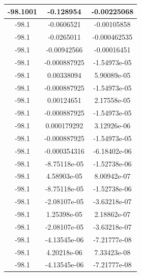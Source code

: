 \documentclass[a4paper,14pt]{extarticle}
\begin{document}
\begin{enumerate}[1. ]
\begin{center}
\begin{longtable}{|c|c|c|}
                  \hline
                  -98.1001 & -0.128954    & -0.00225068  \\
                  \hline
                  -98.1    & -0.0606521   & -0.00105858  \\
                  \hline
                  -98.1    & -0.0265011   & -0.000462535 \\
                  \hline
                  -98.1    & -0.00942566  & -0.00016451  \\
                  \hline
                  -98.1    & -0.000887925 & -1.54973e-05 \\
                  \hline
                  -98.1    & 0.00338094   & 5.90089e-05  \\
                  \hline
                  -98.1    & -0.000887925 & -1.54973e-05 \\
                  \hline
                  -98.1    & 0.00124651   & 2.17558e-05  \\
                  \hline
                  -98.1    & -0.000887925 & -1.54973e-05 \\
                  \hline
                  -98.1    & 0.000179292  & 3.12926e-06  \\
                  \hline
                  -98.1    & -0.000887925 & -1.54973e-05 \\
                  \hline
                  -98.1    & -0.000354316 & -6.18402e-06 \\
                  \hline
                  -98.1    & -8.75118e-05 & -1.52738e-06 \\
                  \hline
                  -98.1    & 4.58903e-05  & 8.00942e-07  \\
                  \hline
                  -98.1    & -8.75118e-05 & -1.52738e-06 \\
                  \hline
                  -98.1    & -2.08107e-05 & -3.63218e-07 \\
                  \hline
                  -98.1    & 1.25398e-05  & 2.18862e-07  \\
                  \hline
                  -98.1    & -2.08107e-05 & -3.63218e-07 \\
                  \hline
                  -98.1    & -4.13545e-06 & -7.21777e-08 \\
                  \hline
                  -98.1    & 4.20218e-06  & 7.33423e-08  \\
                  \hline
                  -98.1    & -4.13545e-06 & -7.21777e-08 \\

\end{longtable}
\end{center}
\end{enumerate}
\end{document}
